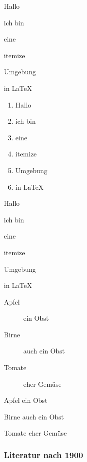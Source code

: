 \documentclass[12pt,ngerman,parskip=half]{scrreprt} %
\begin{document}
\begin{compactitem}[\textcolor{red}{$\Rightarrow$}]
	\item Hallo
	\item ich bin
	\item eine 
	\item itemize
	\item Umgebung
	\item in LaTeX
\end{compactitem}

\begin{enumerate}
	\item Hallo
	\item ich bin
	\item eine 
	\item itemize 
	\item Umgebung
	\item in LaTeX
\end{enumerate}

\begin{compactenum}[1.] \setcounter{enumi}{2} 
	\item Hallo
	\item ich bin
	\item eine 
	\item itemize 
	\item Umgebung
	\item in LaTeX
\end{compactenum}

\begin{description}
\item[Apfel] ein Obst
\item[Birne] auch ein Obst
\item[Tomate] eher Gemüse
\end{description}

\begin{compactdesc}
\item[Apfel] ein Obst
\item[Birne] auch ein Obst
\item[Tomate] eher Gemüse
\end{compactdesc}


\blindtext

\blindtext

\subsubsection{Literatur nach 1900}

\blindtext
\end{document}
